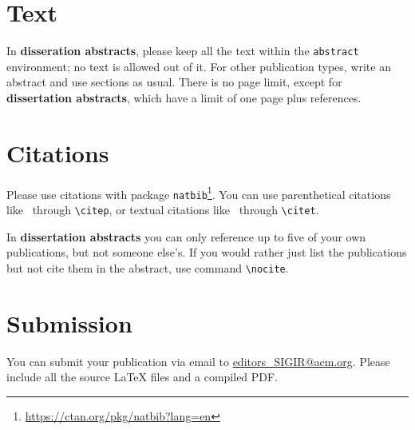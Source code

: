 \documentclass[news]{sigirforum}
\begin{document}
\section{Text}

In \textbf{disseration abstracts}, please keep all the text within the \texttt{abstract} environment; no text is allowed out of it. For other publication types, write an abstract and use sections as usual. There is no page limit, except for \textbf{dissertation abstracts}, which have a limit of one page plus references.

\section{Citations}

Please use citations with package \texttt{natbib}\footnote{\url{https://ctan.org/pkg/natbib?lang=en}}.
You can use parenthetical citations like~\citep{forum} through \texttt{\textbackslash citep}, or textual citations like~\citet{forum} through \texttt{\textbackslash citet}.

In \textbf{dissertation abstracts} you can only reference up to five of your own publications, but not someone else's. If you would rather just list the publications but not cite them in the abstract, use command \texttt{\textbackslash nocite}.

\section{Submission}

You can submit your publication via email to \url{editors\_SIGIR@acm.org}. Please include all the source \LaTeX\xspace files and a compiled PDF.


\end{document}
